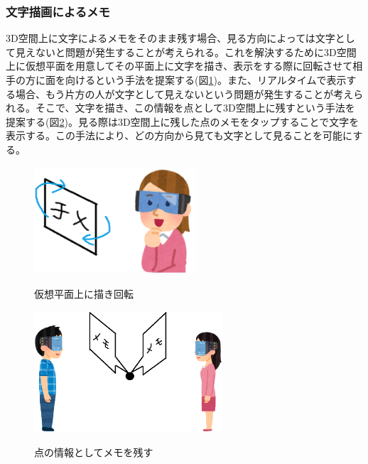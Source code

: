 \documentclass{hissymp}
\begin{document}
\subsubsection{文字描画によるメモ}
3D空間上に文字によるメモをそのまま残す場合、見る方向によっては文字として見えないと問題が発生することが考えられる。これを解決するために3D空間上に仮想平面を用意してその平面上に文字を描き、表示をする際に回転させて相手の方に面を向けるという手法を提案する(図\ref{fig:memokaiten})。また、リアルタイムで表示する場合、もう片方の人が文字として見えないという問題が発生することが考えられる。そこで、文字を描き、この情報を点として3D空間上に残すという手法を提案する(図\ref{fig:tennomemo})。見る際は3D空間上に残した点のメモをタップすることで文字を表示する。この手法により、どの方向から見ても文字として見ることを可能にする。

\begin{figure}[h]
  \begin{center}
    \includegraphics[clip,height=4.0cm,width=6.0cm]{./memokaiten.eps}
    \caption{仮想平面上に描き回転}
    \label{fig:memokaiten}
  \end{center}
\end{figure}

\begin{figure}[h]
  \begin{center}
    \includegraphics[clip,width=7.0cm]{./tennomemo.eps}
    \caption{点の情報としてメモを残す}
    \label{fig:tennomemo}
  \end{center}
\end{figure}
\end{document}
